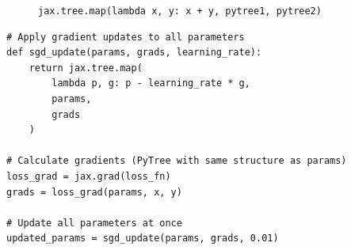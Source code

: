 \begin{frame}
\begin{figure}
\caption{\texttt{jax.tree.map(lambda x, y: x + y, pytree1, pytree2)}}
\end{figure}

\end{frame}


\begin{frame}[fragile]
    
    \begin{verbatim}
# Apply gradient updates to all parameters
def sgd_update(params, grads, learning_rate):
    return jax.tree.map(
        lambda p, g: p - learning_rate * g, 
        params, 
        grads
    )

# Calculate gradients (PyTree with same structure as params)
loss_grad = jax.grad(loss_fn)
grads = loss_grad(params, x, y)

# Update all parameters at once
updated_params = sgd_update(params, grads, 0.01)    
    \end{verbatim}

\end{frame}


